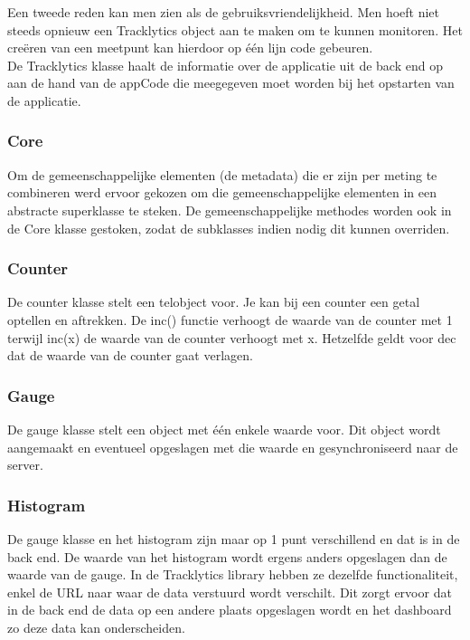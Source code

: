 Een tweede reden kan men zien als de gebruiksvriendelijkheid. Men hoeft niet steeds opnieuw een Tracklytics object aan te maken om te kunnen monitoren. Het cre\"eren van een meetpunt kan hierdoor op \'e\'en lijn code gebeuren.\\


De Tracklytics klasse haalt de informatie over de applicatie uit de back end op aan de hand van de appCode die meegegeven moet worden bij het opstarten van de applicatie.

\subsubsection{Core}
Om de gemeenschappelijke elementen (de metadata) die er zijn per meting te combineren werd ervoor gekozen om die gemeenschappelijke elementen in een abstracte superklasse te steken. De gemeenschappelijke methodes worden ook in de Core klasse gestoken, zodat de subklasses indien nodig dit kunnen overriden. 

\subsubsection{Counter}
De counter klasse stelt een telobject voor. Je kan bij een counter een getal optellen en aftrekken. De inc() functie verhoogt de waarde van de counter met 1 terwijl inc(x) de waarde van de counter verhoogt met x. Hetzelfde geldt voor dec dat de waarde van de counter gaat verlagen. 

\subsubsection{Gauge}
De gauge klasse stelt een object met \'e\'en enkele waarde voor. Dit object wordt aangemaakt en eventueel opgeslagen met die waarde en gesynchroniseerd naar de server. 

\subsubsection{Histogram}
De gauge klasse en het histogram zijn maar op 1 punt verschillend en dat is in de back end. De waarde van het histogram wordt ergens anders opgeslagen dan de waarde van de gauge. In de Tracklytics library hebben ze dezelfde functionaliteit, enkel de URL naar waar de data verstuurd wordt verschilt. Dit zorgt ervoor dat in de back end de data op een andere plaats opgeslagen wordt en het dashboard zo deze data kan onderscheiden.

